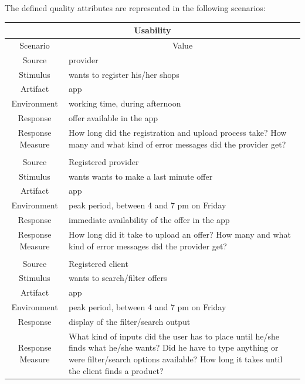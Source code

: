 \newpage
The defined quality attributes are represented in the following scenarios:


\begin{table}[H]
    \begin{tabularx}{\textwidth}{|c|X|}
        \hline
        \multicolumn{2}{c}{\textbf{Usability}} \\
        \hline
        \toprule
        \multicolumn{1}{c}{Scenario} & \multicolumn{1}{c}{Value} \\
        \midrule
        Source & \gls{provider} \\
        Stimulus & wants to register his/her shops \\
        Artifact & app \\
        Environment & working time, during afternoon \\
        Response & offer available in the app \\
        Response Measure & How long did the registration and upload process take? How many and what kind of error messages
        did the \gls{provider} get?\\
         & \\
        Source & Registered \gls{provider} \\
        Stimulus & wants wants to make a last minute offer \\
        Artifact & app \\
        Environment & peak period, between 4 and 7 pm on Friday \\
        Response & immediate availability of the offer in the app \\
        Response Measure & How long did it take to upload an offer? How many and what kind of error messages did the 
        \gls{provider} get? \\
        & \\
        Source & Registered \gls{client} \\
        Stimulus & wants to search/filter offers \\
        Artifact & app \\
        Environment & peak period, between 4 and 7 pm on Friday \\
        Response & display of the filter/search output \\
        Response Measure & What kind of inputs did the user has to place until he/she finds what he/she wants?
        Did he have to type anything or were filter/search options available? How long it takes until the client
        finds a product? \\
        \bottomrule
    \end{tabularx}
\end{table}


